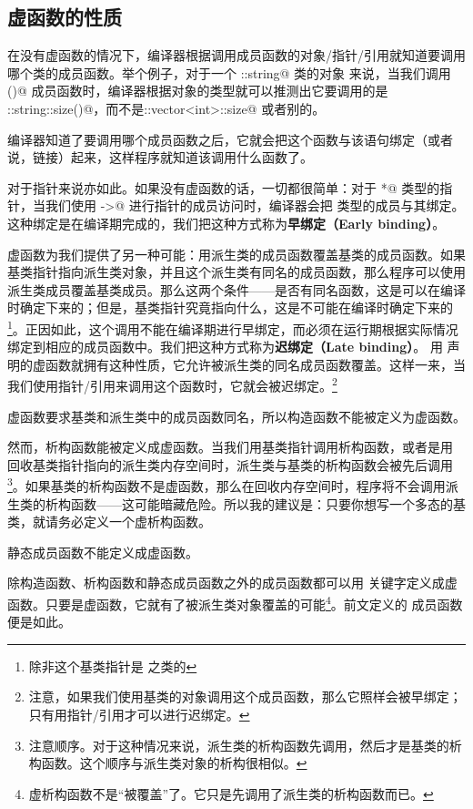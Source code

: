 \subsection*{虚函数的性质}
在没有虚函数的情况下，编译器根据调用成员函数的对象/指针/引用就知道要调用哪个类的成员函数。举个例子，对于一个 \lstinline@std::string@ 类的对象 \lstinline@str@ 来说，当我们调用 \lstinline@size()@ 成员函数时，编译器根据对象的类型就可以推测出它要调用的是 \lstinline@std::string::size()@，而不是\newline\lstinline@std::vector<int>::size@ 或者别的。\par
编译器知道了要调用哪个成员函数之后，它就会把这个函数与该语句绑定（或者说，链接）起来，这样程序就知道该调用什么函数了。\par
对于指针来说亦如此。如果没有虚函数的话，一切都很简单：对于 \lstinline@Type*@ 类型的指针，当我们使用 \lstinline@->@ 进行指针的成员访问时，编译器会把 \lstinline@Type@ 类型的成员与其绑定。这种绑定是在编译期完成的，我们把这种方式称为\textbf{早绑定（Early binding）}。\par
虚函数为我们提供了另一种可能：用派生类的成员函数覆盖基类的成员函数。如果基类指针指向派生类对象，并且这个派生类有同名的成员函数，那么程序可以使用派生类成员覆盖基类成员。那么这两个条件——是否有同名函数，这是可以在编译时确定下来的；但是，基类指针究竟指向什么，这是不可能在编译时确定下来的\footnote{除非这个基类指针是 \lstinline@constexpr@ 之类的}。正因如此，这个调用不能在编译期进行早绑定，而必须在运行期根据实际情况绑定到相应的成员函数中。我们把这种方式称为\textbf{迟绑定（Late binding）}。
用 \lstinline@virtual@ 声明的虚函数就拥有这种性质，它允许被派生类的同名成员函数覆盖。这样一来，当我们使用指针/引用来调用这个函数时，它就会被迟绑定。\footnote{注意，如果我们使用基类的对象调用这个成员函数，那么它照样会被早绑定；只有用指针/引用才可以进行迟绑定。}\par
虚函数要求基类和派生类中的成员函数同名，所以构造函数不能被定义为虚函数。\par
然而，析构函数能被定义成虚函数。当我们用基类指针调用析构函数，或者是用 \lstinline@delete@ 回收基类指针指向的派生类内存空间时，派生类与基类的析构函数会被先后调用\footnote{注意顺序。对于这种情况来说，派生类的析构函数先调用，然后才是基类的析构函数。这个顺序与派生类对象的析构很相似。}。如果基类的析构函数不是虚函数，那么在回收内存空间时，程序将不会调用派生类的析构函数——这可能暗藏危险。所以我的建议是：只要你想写一个多态的基类，就请务必定义一个虚析构函数。\par
静态成员函数不能定义成虚函数。\par
除构造函数、析构函数和静态成员函数之外的成员函数都可以用 \lstinline@virtual@ 关键字定义成虚函数。只要是虚函数，它就有了被派生类对象覆盖的可能\footnote{虚析构函数不是``被覆盖''了。它只是先调用了派生类的析构函数而已。}。前文定义的 \lstinline@area@ 成员函数便是如此。\par
